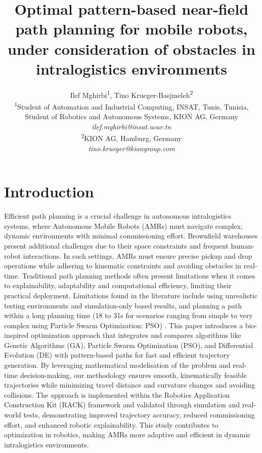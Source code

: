 \documentclass{amam}                %
\title{Optimal pattern-based near-field path planning for mobile robots, under consideration of obstacles in intralogistics environments}
\author{Ilef Mghirbi\textsuperscript{1}, Tino Krueger-Basjmeleh\textsuperscript{2}\\
\textsuperscript{1}Student of Automation and Industrial Computing, INSAT, Tunis, Tunisia, \\Student of Robotics and Autonomous Systems, KION AG, Germany\\
  {\it ilef.mghirbi@insat.ucar.tn} \\
\textsuperscript{2}KION AG, Hamburg, Germany\\
  {\it tino.krueger@kiongroup.com} \\
}
\begin{document}
\maketitle


\section{Introduction}
Efficient path planning is a crucial challenge in autonomous intralogistics systems, where Autonomous Mobile Robots (AMRs) must navigate complex, dynamic environments with minimal commissioning effort.  Brownfield warehouses present additional challenges due to their space constraints and frequent human-robot interactions. In such settings, AMRs must ensure precise pickup and drop operations while adhering to kinematic constraints and avoiding obstacles in real-time. Traditional path planning methods often present limitations when it comes to explainability, adaptability and computational efficiency, limiting their practical deployment. Limitations found in the literature include using unrealistic testing environments and simulation-only based results, and planning a path within a long planning time (18 to 31s for scenarios ranging from simple to very complex using Particle Swarm Optimization: PSO) \cite{ref1}. This paper introduces a bio-inspired optimization approach that integrates and compares algorithms like Genetic Algorithms (GA), Particle Swarm Optimization (PSO), and Differential Evolution (DE) with pattern-based paths for fast and efficient trajectory generation. By leveraging mathematical modelisation of the problem and real-time decision-making, our methodology ensures smooth, kinematically feasible trajectories while minimizing travel distance and curvature changes and avoiding collisions. The approach is implemented within the Robotics Application Construction Kit (RACK) framework and validated through simulation and real-world tests, demonstrating improved trajectory accuracy, reduced commissioning effort, and enhanced robotic explainability. This study contributes to optimization in robotics, making AMRs more adaptive and efficient in dynamic intralogistics environments.
\end{document}
